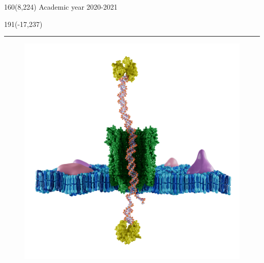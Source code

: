 %
\begin{textblock}{160}(8,224)
\textblockcolour{}
\vspace{-\parskip}
\flushright
Academic year 2020-2021
\end{textblock}
%
\begin{textblock}{191}(-17,237)
{\color{blueline}\rule{550pt}{5.5pt}}
\end{textblock}
%
\vspace*{5cm}
\begin{center}
    \begin{figure}[H]
        \centering
        \includegraphics[scale=0.182]{Figures/Coverphoto.png}
    \end{figure}
\end{center}
%
\vfill
